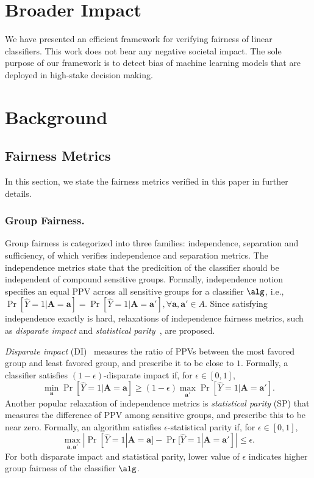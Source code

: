 \clearpage
\appendix



\clearpage

		\section{Broader Impact}
		We have presented an efficient framework for verifying fairness of linear classifiers. This work does not bear any negative societal impact. The sole purpose of our framework is to detect bias of machine learning models that are deployed in high-stake decision making. 
		

		\section{Background}
		
		\subsection{Fairness Metrics}
		In this section, we state the fairness metrics verified in this paper in further details.
		\subsubsection{Group Fairness.} Group fairness is categorized into three families: independence, separation and sufficiency, of which {\framework} verifies independence and separation metrics. 
		The independence metrics state that the predicition of the classifier should be independent of compound sensitive groups. Formally, independence notion specifies an equal PPV across all sensitive groups for a classifier $\alg$, i.e., $\Pr[\hat{Y} =1 | \mathbf{A} =  \mathbf{a}]  =  \Pr[\hat{Y} =1 | \mathbf{A} =  \mathbf{a}'] , \forall \mathbf{a}, \mathbf{a}' \in A$.
		Since satisfying independence exactly is hard, relaxations of independence fairness metrics, such as \textit{disparate impact} and \textit{statistical parity}~\cite{dwork2012fairness,feldman2015certifying}, are proposed. 
		
		\textit{Disparate impact} (DI)~\cite{feldman2015certifying} measures the ratio of PPVs between the most favored group and least favored group, and prescribe it to be close to $1$. Formally, a classifier satisfies $(1 - \epsilon)$-disparate impact if, for $\epsilon \in [0,1] $,
		\[
		\min_{\mathbf{a}} \Pr[\hat{Y} =1 | \mathbf{A} =  \mathbf{a}]  \ge (1 - \epsilon) \max_{\mathbf{a}'} \Pr[\hat{Y} =1 | \mathbf{A} =  \mathbf{a}'].
		\]
		Another popular relaxation of independence metrics  is \textit{statistical parity} (SP) that measures the difference of PPV among sensitive groups, and prescribe this to be near zero. Formally, an algorithm satisfies $\epsilon$-statistical parity if, for $\epsilon \in [0,1] $, 
		\[
		\max_{\mathbf{a}, \mathbf{a}'}|\Pr[\hat{Y} =1 | \mathbf{A} = \mathbf{a}] - \Pr [\hat{Y} = 1| \mathbf{A} = \mathbf{a}']| \le \epsilon.
		\]
		For both disparate impact and statistical parity, lower value of $\epsilon$ indicates higher group fairness of the classifier $\alg$. 
		
